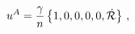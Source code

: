 \begin{equation}\label{unew}
u^A = {\gamma \over n} \left\{ 1,0,0,0,0,\dot{\cal R}\right\}\, ,
\end{equation}

